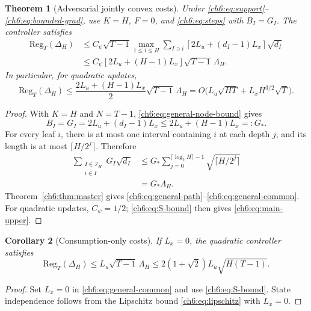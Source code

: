 \documentclass[11pt]{article}
\newcommand{\Reg}{\mathrm{Reg}}
\theoremstyle{plain}
\newtheorem{Thm:Theorem}{Theorem}[section]
\newtheorem{Thm:Corollary}[Thm:Theorem]{Corollary}
\theoremstyle{remark}
\numberwithin{equation}{section}
\begin{document}
\begin{Thm:Theorem}[Adversarial jointly convex costs]\label{ch6:thm:general}
Under \eqref{ch6:eq:support}--\eqref{ch6:eq:bounded-grad}, use $K=H$, $F=0$,
and \eqref{ch6:eq:steps} with $B_I=G_I$. The controller satisfies
\begin{align}
 \Reg_T(\Delta_H)
 &\le{C_\psi}\sqrt{T-1}
 \max_{1\le i\le H}\sum_{I\ni i}
 [2L_u+(d_I-1)L_x]\sqrt{d_I}\label{ch6:eq:general-path}\\
 &\le{C_\psi}[2L_u+(H-1)L_x]\sqrt{T-1}\,\Lambda_{H}.
 \label{ch6:eq:general-common}
\end{align}
In particular, for quadratic updates,
\begin{equation}\label{ch6:eq:main-upper}
 \boxed{\Reg_T(\Delta_H)\le
 \frac{2L_u+(H-1)L_x}{2}\sqrt{T-1}\,\Lambda_{H}
 =O\bigl(L_u\sqrt{HT}+L_xH^{3/2}\sqrt T\bigr).}
\end{equation}
\end{Thm:Theorem}
\begin{proof}
With $K=H$ and $N=T-1$, \eqref{ch6:eq:general-node-bound} gives
\[
B_I=G_I=2L_u+(d_I-1)L_x
\le 2L_u+(H-1)L_x=:G_*.
\]
For every leaf $i$, there is at most one interval containing $i$ at each
depth $j$, and its length is at most $\lceil H/2^j\rceil$.  Therefore
\begin{align*}
\sum_{\substack{I\in\mathcal I_{H}\\i\in I}}
G_I\sqrt{d_I}
&\le G_*\sum_{j=0}^{\lceil\log_2H\rceil-1}
\sqrt{\lceil H/2^j\rceil}\\
&=G_*\Lambda_{H}.
\end{align*}
Theorem~\ref{ch6:thm:master} gives
\eqref{ch6:eq:general-path}--\eqref{ch6:eq:general-common}.
For quadratic updates, $C_\psi=1/2$; \eqref{ch6:eq:S-bound} then gives
\eqref{ch6:eq:main-upper}.
\end{proof}

\begin{Thm:Corollary}[Consumption-only costs]\label{ch6:cor:action}
If $L_x=0$, the quadratic controller satisfies
\begin{equation}\label{ch6:eq:action-upper}
 \Reg_T(\Delta_H)\le L_u\sqrt{T-1}\,\Lambda_{H}
 \le2(1+\sqrt2)L_u\sqrt{H(T-1)}.
\end{equation}
\end{Thm:Corollary}
\begin{proof}
Set $L_x=0$ in \eqref{ch6:eq:general-common} and use
\eqref{ch6:eq:S-bound}. State independence follows from the Lipschitz bound
\eqref{ch6:eq:lipschitz} with $L_x=0$.
\end{proof}
\end{document}

